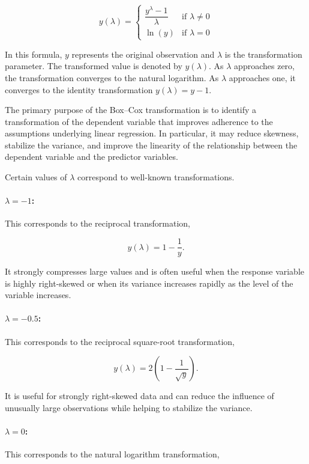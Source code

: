 \begin{equation}
y(\lambda) =
\begin{cases}
\dfrac{y^\lambda - 1}{\lambda} & \text{if } \lambda \neq 0 \\
\ln(y) & \text{if } \lambda = 0
\end{cases}
\end{equation}

In this formula, \(y\) represents the original observation and \(\lambda\) is the transformation parameter. The transformed value is denoted by \(y(\lambda)\). As \(\lambda\) approaches zero, the transformation converges to the natural logarithm. As \(\lambda\) approaches one, it converges to the identity transformation \(y(\lambda)=y-1\).

\bigskip

The primary purpose of the Box--Cox transformation is to identify a transformation of the dependent variable that improves adherence to the assumptions underlying linear regression. In particular, it may reduce skewness, stabilize the variance, and improve the linearity of the relationship between the dependent variable and the predictor variables.

\bigskip

Certain values of \(\lambda\) correspond to well-known transformations.

\paragraph{\(\lambda = -1\):}
This corresponds to the reciprocal transformation,

\[
y(\lambda)=1-\frac{1}{y}.
\]

It strongly compresses large values and is often useful when the response variable is highly right-skewed or when its variance increases rapidly as the level of the variable increases.

\paragraph{\(\lambda = -0.5\):}
This corresponds to the reciprocal square-root transformation,

\[
y(\lambda)=2\left(1-\frac{1}{\sqrt{y}}\right).
\]

It is useful for strongly right-skewed data and can reduce the influence of unusually large observations while helping to stabilize the variance.

\paragraph{\(\lambda = 0\):}
This corresponds to the natural logarithm transformation,


